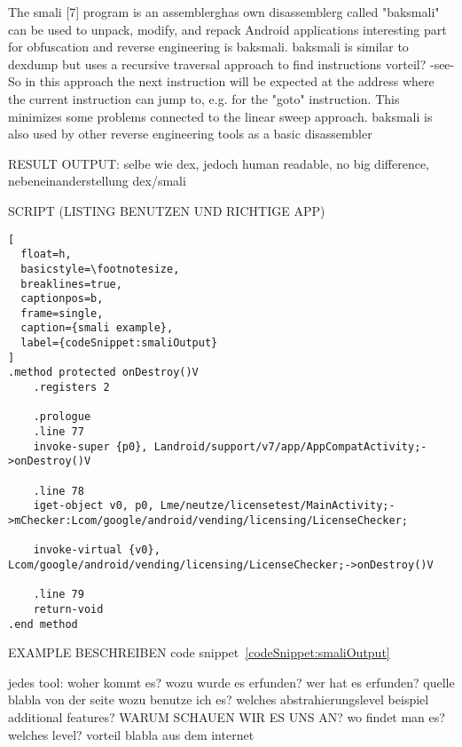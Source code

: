 The smali [7] program is an \gls{assemblerg}has own \gls{disassemblerg} called "baksmali"\newline
can be used to unpack, modify, and repack Android applications\newline
interesting part for obfuscation and reverse engineering is baksmali. baksmali is similar to dexdump but uses a recursive traversal approach to find instructions\newline
vorteil? -see- So in this approach the next instruction will be expected at the address where the current instruction can jump to, e.g. for the "goto" instruction. This minimizes some problems connected to the linear sweep approach. baksmali is also used by other reverse engineering tools as a basic disassembler\newline

RESULT OUTPUT:
selbe wie dex, jedoch human readable, no big difference, nebeneinanderstellung dex/smali

SCRIPT (LISTING BENUTZEN UND RICHTIGE APP)


\begin{lstlisting}[
  float=h,
  basicstyle=\footnotesize,
  breaklines=true,
  captionpos=b,
  frame=single,
  caption={smali example},
  label={codeSnippet:smaliOutput}
]
.method protected onDestroy()V
    .registers 2

    .prologue
    .line 77
    invoke-super {p0}, Landroid/support/v7/app/AppCompatActivity;->onDestroy()V

    .line 78
    iget-object v0, p0, Lme/neutze/licensetest/MainActivity;->mChecker:Lcom/google/android/vending/licensing/LicenseChecker;

    invoke-virtual {v0}, Lcom/google/android/vending/licensing/LicenseChecker;->onDestroy()V

    .line 79
    return-void
.end method
\end{lstlisting}
EXAMPLE BESCHREIBEN code snippet~\ref{codeSnippet:smaliOutput}

jedes tool:\newline
woher kommt es?\newline
wozu wurde es erfunden?\newline
wer hat es erfunden? quelle\newline
blabla von der seite\newline
wozu benutze ich es?\newline
welches abstrahierungslevel\newline
beispiel\newline
additional features?\newline
WARUM SCHAUEN WIR ES UNS AN?\newline
wo findet man es?\newline
welches level?\newline
vorteil\newline
blabla aus dem internet\newline
